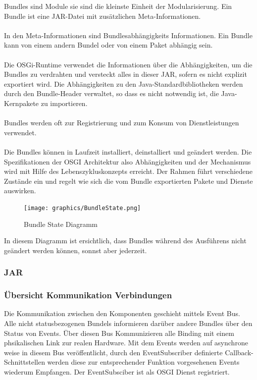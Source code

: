 Bundles sind Module sie sind die kleinste Einheit der Modularisierung. Ein Bundle ist eine JAR-Datei mit zusätzlichen Meta-Informationen.\\
\\
In den Meta-Informationen sind Bundlesabhängigkeits Informationen. Ein Bundle kann von einem andern Bundel oder von einem Paket abhängig sein.\\
\\
Die OSGi-Runtime verwendet die Informationen über die Abhängigkeiten, um die Bundles zu verdrahten und versteckt alles in dieser JAR, sofern es nicht explizit exportiert wird. Die Abhängigkeiten zu den Java-Standardbibliotheken werden durch den Bundle-Header verwaltet, so dass es nicht notwendig ist, die Java-Kernpakete zu importieren.\\
\\
Bundles werden oft zur Registrierung und zum Konsum von Dienstleistungen verwendet.\\
\\
Die Bundles können in Laufzeit installiert, deinstalliert und geändert werden. Die Spezifikationen der OSGI Architektur also Abhängigkeiten und der Mechanismus wird mit Hilfe des Lebenszykluskonzepts erreicht. Der Rahmen führt verschiedene Zustände ein und regelt wie sich die vom Bundle exportierten Pakete und Dienste auswirken. 

 \begin{figure}[H]
	\centering
	\texttt{[image: graphics/BundleState.png]}
	\caption{Bundle State Diagramm} 	
	\label{pic: BundleState}
\end{figure} 

In diesem Diagramm ist ersichtlich, dass Bundles während des Ausführens nicht geändert werden können, sonnst aber jederzeit.

\subsubsection{JAR}
\subsubsection{Übersicht Kommunikation Verbindungen}
Die Kommunikation zwischen den Komponenten geschieht mittels Event Bus. Alle nicht statusbezogenen Bundels informieren darüber andere Bundles über den Status von Events. Über diesen Bus Kommunizieren alle Binding mit einem phsikalischen Link zur realen Hardware. Mit dem Events werden auf asynchrone weise in diesem Bus veröffentlicht, durch den EventSubscriber definierte Callback-Schnittstellen werden diese zur entsprechender Funktion vorgesehenen Events wiederum Empfangen. Der EventSubsciber ist als OSGI Dienst registriert.

